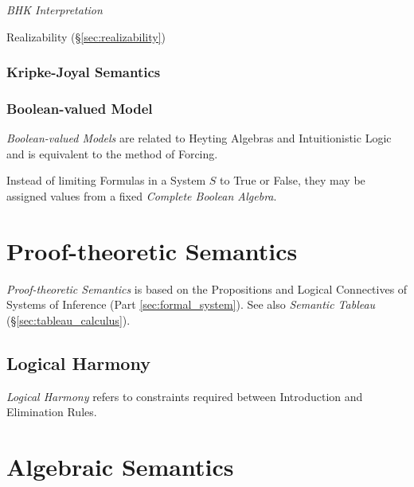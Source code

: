 \emph{BHK Interpretation}

Realizability (\S\ref{sec:realizability})



\subsubsection{Kripke-Joyal Semantics}\label{sec:kripke_joyal}

\subsubsection{Boolean-valued Model}\label{sec:boolean_model}

\emph{Boolean-valued Models} are related to Heyting Algebras and
Intuitionistic Logic and is equivalent to the method of Forcing.

Instead of limiting Formulas in a System $S$ to True or False, they
may be assigned values from a fixed \emph{Complete Boolean Algebra}.



\section{Proof-theoretic Semantics}\label{sec:proof_semantics}

\emph{Proof-theoretic Semantics} is based on the Propositions and
Logical Connectives of Systems of Inference (Part
\ref{sec:formal_system}). See also \emph{Semantic Tableau}
(\S\ref{sec:tableau_calculus}).



\subsection{Logical Harmony} \label{sec:logical_harmony}

\emph{Logical Harmony} refers to constraints required between
Introduction and Elimination Rules.



\section{Algebraic Semantics}\label{sec:algebraic_semantics}

